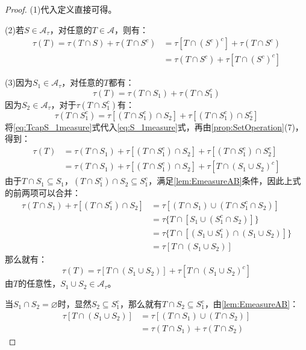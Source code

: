 \begin{proof}
	(1)代入定义直接可得。\par
	(2)若$S\in \mathscr{A}_{\tau}$，对任意的$T\in \mathscr{A}$，则有：
	\begin{align*}
		\tau(T)=\tau(T\cap S)+\tau(T\cap S^c)
		&=\tau[T\cap(S^c)^c]+\tau(T\cap S^c) \\
		&=\tau(T\cap S^c)+\tau[T\cap(S^c)^c]
	\end{align*}\par
	(3)因为$S_1\in \mathscr{A}_{\tau}$，对任意的$T$都有：
	\begin{equation}\label{eq:S_1measure}
		\tau(T)=\tau(T\cap S_1)+\tau(T\cap S_1^c)
	\end{equation}
	因为$S_2\in \mathscr{A}_{\tau}$，对于$\tau(T\cap S_1^c)$有：
	\begin{equation}\label{eq:TcapS_1measure}
		\tau(T\cap S_1^c)=\tau[(T\cap S_1^c)\cap S_2]+\tau[(T\cap S_1^c)\cap S_2^c]
	\end{equation}
	将\eqref{eq:TcapS_1measure}式代入\eqref{eq:S_1measure}式，再由\cref{prop:SetOperation}(7)，得到：
	\begin{align*}
		\tau(T)&=\tau(T\cap S_1)+\tau[(T\cap S_1^c)\cap S_2]+\tau[(T\cap S_1^c)\cap S_2^c] \\
		&=\tau(T\cap S_1)+\tau[(T\cap S_1^c)\cap S_2]+\tau[T\cap(S_1\cup S_2)^c]
	\end{align*}
	由于$T\cap S_1\subseteq S_1$，$(T\cap S_1^c)\cap S_2\subseteq S_1^c$，满足\cref{lem:EmeasureAB}条件，因此上式的前两项可以合并：
	\begin{align*}
		\tau(T\cap S_1)+\tau[(T\cap S_1^c)\cap S_2]&=\tau[(T\cap S_1)\cup(T\cap S_1^c\cap S_2)] \\
		&=\tau\{T\cap[S_1\cup(S_1^c\cap S_2)]\} \\
		&=\tau\{T\cap[(S_1\cup S_1^c)\cap(S_1\cup S_2)]\} \\
		&=\tau[T\cap(S_1\cup S_2)]
	\end{align*}
	那么就有：
	\begin{equation*}
		\tau(T)=\tau[T\cap(S_1\cup S_2)]+\tau[T\cap(S_1\cup S_2)^c]
	\end{equation*}
	由$T$的任意性，$S_1\cup S_2\in \mathscr{A}_{\tau}$。\par
	当$S_1\cap S_2=\varnothing$时，显然$S_2\subseteq S_1^c$，那么就有$T\cap S_2\subseteq S_1^c$，由\cref{lem:EmeasureAB}：
	\begin{align*}
		\tau[T\cap(S_1\cup S_2)]&=\tau[(T\cap S_1)\cup(T\cap S_2)]\\
		&=\tau(T\cap S_1)+\tau(T\cap S_2)

\end{align*}
\end{proof}
